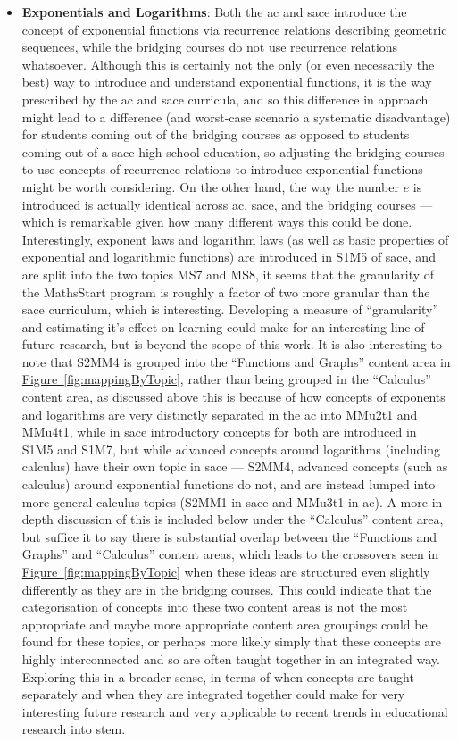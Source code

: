 \documentclass[twoside,12pt,a4paper]{report}
\newcommand{\reffig}[1]{\hyperref[fig:#1]{Figure~\ref{fig:#1}}}
\begin{document}
\begin{itemize}
	\item \textbf{Exponentials and Logarithms}: Both the \gls{ac} and \gls{sace} introduce the concept of exponential functions via recurrence relations describing geometric sequences, while the bridging courses do not use recurrence relations whatsoever. Although this is certainly not the only (or even necessarily the best) way to introduce and understand exponential functions, it is the way prescribed by the \gls{ac} and \gls{sace} curricula, and so this difference in approach might lead to a difference (and worst-case scenario a systematic disadvantage) for students coming out of the bridging courses as opposed to students coming out of a \gls{sace} high school education, so adjusting the bridging courses to use concepts of recurrence relations to introduce exponential functions might be worth considering. On the other hand, the way the number $e$ is introduced is actually identical across \gls{ac}, \gls{sace}, and the bridging courses --- which is remarkable given how many different ways this could be done. Interestingly, exponent laws and logarithm laws (as well as basic properties of exponential and logarithmic functions) are introduced in S1M5 of \gls{sace}, and are split into the two topics MS7 and MS8, it seems that the granularity of the MathsStart program is roughly a factor of two more granular than the \gls{sace} curriculum, which is interesting. Developing a measure of ``granularity'' and estimating it's effect on learning could make for an interesting line of future research, but is beyond the scope of this work. It is also interesting to note that S2MM4 is grouped into the ``Functions and Graphs'' content area in \reffig{mappingByTopic}, rather than being grouped in the ``Calculus'' content area, as discussed above this is because of how concepts of exponents and logarithms are very distinctly separated in the \gls{ac} into MMu2t1 and MMu4t1, while in \gls{sace} introductory concepts for both are introduced in S1M5 and S1M7, but while advanced concepts around logarithms (including calculus) have their own topic in \gls{sace} --- S2MM4, advanced concepts (such as calculus) around exponential functions do not, and are instead lumped into more general calculus topics (S2MM1 in \gls{sace} and MMu3t1 in \gls{ac}). A more in-depth discussion of this is included below under the ``Calculus'' content area, but suffice it to say there is substantial overlap between the ``Functions and Graphs'' and ``Calculus'' content areas, which leads to the crossovers seen in \reffig{mappingByTopic} when these ideas are structured even slightly differently as they are in the bridging courses. This could indicate that the categorisation of concepts into these two content areas is not the most appropriate and maybe more appropriate content area groupings could be found for these topics, or perhaps more likely simply that these concepts are highly interconnected and so are often taught together in an integrated way. Exploring this in a broader sense, in terms of when concepts are taught separately and when they are integrated together could make for very interesting future research and very applicable to recent trends in educational research into \gls{stem}.

\end{itemize}
\end{document}
